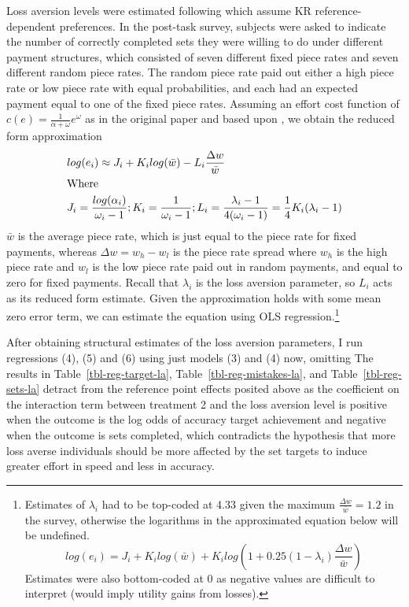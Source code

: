 \documentclass[12pt, letterpaper, DIV=11, numbers=noendperiod]{article}
\begin{document}
Loss aversion levels were estimated following \textcite{campos-mercade.2024.gustibusdisputes} which assume KR reference-dependent preferences. In the post-task survey, subjects were asked to indicate the number of correctly completed sets they were willing to do under different payment structures, which consisted of seven different fixed piece rates and seven different random piece rates. The random piece rate paid out either a high piece rate or low piece rate with equal probabilities, and each had an expected payment equal to one of the fixed piece rates. Assuming an effort cost function of \(c(e) = \frac {1}{\alpha + \omega} e^\omega\) as in the original paper and based upon \textcite{augenblick.2019.experimenttime}, we obtain the reduced form approximation
\[
\begin{aligned}
& log(e_i) \approx J_i + K_i log(\bar{w}) - L_i \frac{\Delta w}{\bar w} \\
& \text{Where} \\
& J_i = \frac {log(\alpha_i)}{\omega_i - 1}; \space K_i = \frac {1}{\omega_i - 1}; \space L_i = \frac {\lambda_i -1}{4(\omega_i - 1)} = \frac {1}{4} K_i (\lambda_i -1)
\end{aligned}
\]
\(\bar w\) is the average piece rate, which is just equal to the piece rate for fixed payments, whereas \(\Delta w = w_h - w_l\) is the piece rate spread where \(w_h\) is the high piece rate and \(w_l\) is the low piece rate paid out in random payments, and equal to zero for fixed payments. Recall that \(\lambda_i\) is the loss aversion parameter, so \(L_i\) acts as its reduced form estimate. Given the approximation holds with some mean zero error term, we can estimate the equation using OLS regression.\footnote{Estimates of \(\lambda_i\) had to be top-coded at 4.33 given the maximum \(\frac{\Delta w}{\bar w} = 1.2\) in the survey, otherwise the logarithms in the approximated equation below will be undefined.
  \[
  log(e_i) = J_i + K_i log(\bar{w}) + K_i log(1 + 0.25 (1 - \lambda_i) \frac{\Delta w}{\bar w})
  \]
  Estimates were also bottom-coded at 0 as negative values are difficult to interpret (would imply utility gains from losses).}

After obtaining structural estimates of the loss aversion parameters, I run regressions (4), (5) and (6) using just models (3) and (4) now, omitting The results in Table~\ref{tbl-reg-target-la}, Table~\ref{tbl-reg-mistakes-la}, and Table~\ref{tbl-reg-sets-la} detract from the reference point effects posited above as the coefficient on the interaction term between treatment 2 and the loss aversion level is positive when the outcome is the log odds of accuracy target achievement and negative when the outcome is sets completed, which contradicts the hypothesis that more loss averse individuals should be more affected by the set targets to induce greater effort in speed and less in accuracy.
\end{document}

